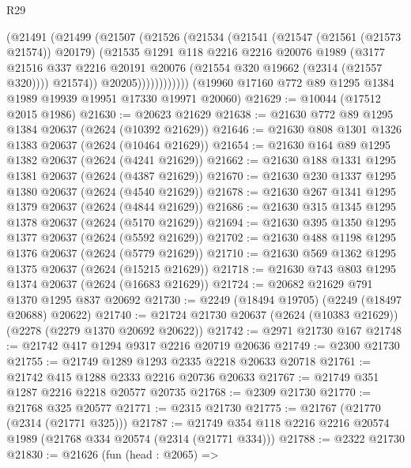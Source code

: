 \begin{lexlean}{R29}
\begin{coremodule}
                  (@21491
                    (@21499
                      (@21507
                        (@21526
                          (@21534
                            (@21541
                              (@21547 (@21561 (@21573 @21574)) @20179)
                              (@21535
                                @1291
                                @118
                                @2216
                                @2216
                                @20076
                                @1989
                                (@3177
                                  @21516
                                  @337
                                  @2216
                                  @20191
                                  @20076
                                  (@21554 @320 @19662 (@2314 (@21557 @320))))
                                @21574))
                            @20205))))))))))))
    (@19960 @17160 @772 @89 @1295 @1384 @1989 @19939 @19951 @17330 @19971 @20060)
@21629 := @10044 (@17512 @2015 @1986)
@21630 := @20623 @21629
@21638 := @21630 @772 @89 @1295 @1384 @20637 (@2624 (@10392 @21629))
@21646 := @21630 @808 @1301 @1326 @1383 @20637 (@2624 (@10464 @21629))
@21654 := @21630 @164 @89 @1295 @1382 @20637 (@2624 (@4241 @21629))
@21662 := @21630 @188 @1331 @1295 @1381 @20637 (@2624 (@4387 @21629))
@21670 := @21630 @230 @1337 @1295 @1380 @20637 (@2624 (@4540 @21629))
@21678 := @21630 @267 @1341 @1295 @1379 @20637 (@2624 (@4844 @21629))
@21686 := @21630 @315 @1345 @1295 @1378 @20637 (@2624 (@5170 @21629))
@21694 := @21630 @395 @1350 @1295 @1377 @20637 (@2624 (@5592 @21629))
@21702 := @21630 @488 @1198 @1295 @1376 @20637 (@2624 (@5779 @21629))
@21710 := @21630 @569 @1362 @1295 @1375 @20637 (@2624 (@15215 @21629))
@21718 := @21630 @743 @803 @1295 @1374 @20637 (@2624 (@16683 @21629))
@21724 := @20682 @21629 @791 @1370 @1295 @837 @20692
@21730 := @2249 (@18494 @19705) (@2249 (@18497 @20688) @20622)
@21740 := @21724 @21730 @20637 (@2624 (@10383 @21629)) (@2278 (@2279 @1370 @20692 @20622))
@21742 := @2971 @21730 @167
@21748 := @21742 @417 @1294 @9317 @2216 @20719 @20636
@21749 := @2300 @21730
@21755 := @21749 @1289 @1293 @2335 @2218 @20633 @20718
@21761 := @21742 @415 @1288 @2333 @2216 @20736 @20633
@21767 := @21749 @351 @1287 @2216 @2218 @20577 @20735
@21768 := @2309 @21730
@21770 := @21768 @325 @20577
@21771 := @2315 @21730
@21775 := @21767 (@21770 (@2314 (@21771 @325)))
@21787 := @21749 @354 @118 @2216 @2216 @20574 @1989 (@21768 @334 @20574 (@2314 (@21771 @334)))
@21788 := @2322 @21730
@21830 := @21626
    (fun (head : @2065) =>

\end{coremodule}
\end{lexlean}
